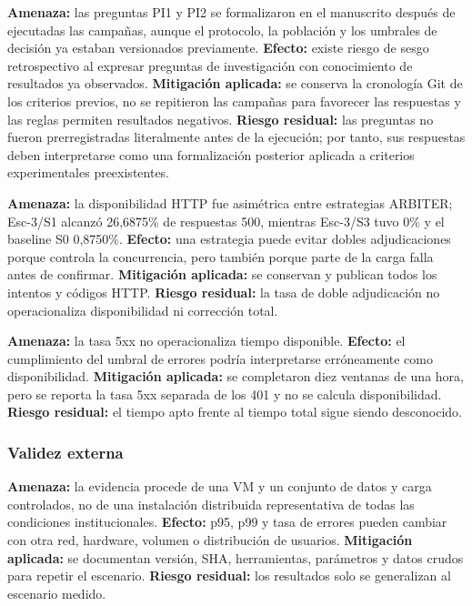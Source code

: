 \textbf{Amenaza:} las preguntas PI1 y PI2 se formalizaron en el manuscrito
después de ejecutadas las campañas, aunque el protocolo, la población y los
umbrales de decisión ya estaban versionados previamente.
\textbf{Efecto:} existe riesgo de sesgo retrospectivo al expresar preguntas de
investigación con conocimiento de resultados ya observados.
\textbf{Mitigación aplicada:} se conserva la cronología Git de los criterios
previos, no se repitieron las campañas para favorecer las respuestas y las
reglas permiten resultados negativos.
\textbf{Riesgo residual:} las preguntas no fueron prerregistradas literalmente
antes de la ejecución; por tanto, sus respuestas deben interpretarse como una
formalización posterior aplicada a criterios experimentales preexistentes.

\textbf{Amenaza:} la disponibilidad HTTP fue asimétrica entre estrategias
ARBITER; Esc-3/S1 alcanzó 26,6875\% de respuestas 500, mientras Esc-3/S3 tuvo
0\% y el baseline S0 0,8750\%. \textbf{Efecto:} una estrategia puede evitar
dobles adjudicaciones porque controla la concurrencia, pero también porque parte
de la carga falla antes de confirmar. \textbf{Mitigación aplicada:} se conservan
y publican todos los intentos y códigos HTTP. \textbf{Riesgo residual:} la tasa
de doble adjudicación no operacionaliza disponibilidad ni corrección total.

\textbf{Amenaza:} la tasa 5xx no operacionaliza tiempo disponible.
\textbf{Efecto:} el cumplimiento del umbral de errores podría interpretarse
erróneamente como disponibilidad. \textbf{Mitigación aplicada:} se completaron
diez ventanas de una hora, pero se reporta la tasa 5xx separada de los 401 y no
se calcula disponibilidad. \textbf{Riesgo residual:} el tiempo apto frente al
tiempo total sigue siendo desconocido.

\subsubsection{Validez externa}

\textbf{Amenaza:} la evidencia procede de una VM y un conjunto de datos y carga
controlados, no de una instalación distribuida representativa de todas las
condiciones institucionales. \textbf{Efecto:} p95, p99 y tasa de errores pueden
cambiar con otra red, hardware, volumen o distribución de usuarios.
\textbf{Mitigación aplicada:} se documentan versión, SHA, herramientas,
parámetros y datos crudos para repetir el escenario. \textbf{Riesgo residual:}
los resultados solo se generalizan al escenario medido.


